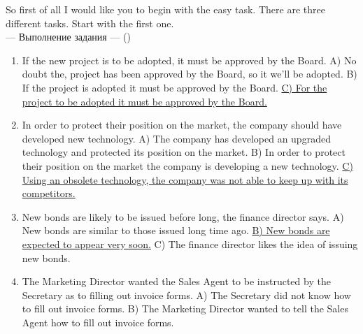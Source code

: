 \documentclass[main.tex]{subfiles}
\begin{document}
So first of all I would like you to begin with the easy task.
There are three different tasks.
Start with the first one.
\\

\hypertarget{ltask:2024-04-03-1}{--- Выполнение задания ---} (\hyperref[task:2024-04-03-1]{\color{blue}{перейти к тексту задания}})
\\

\vspace{5pt}
\begin{enumerate}[nosep, leftmargin=*]
	\itemsep15pt
	\item If the new project is to be adopted, it must be approved by the Board.\newline
		A) No doubt the, project has been approved by the Board, so it we'll be adopted.\newline
		B) If the project is adopted it must be approved by the Board.\newline
		\uline{C) For the project to be adopted it must be approved by the Board.}
	\item In order to protect their position on the market, the company should have developed new technology.\newline
		A) The company has developed an upgraded technology and protected its position on the market.\newline
		B) In order to protect their position on the market the company is developing a new technology.\newline
		\uline{C) Using an obsolete technology, the company was not able to keep up with its competitors.}
	\item New bonds are likely to be issued before long, the finance director says.\newline
		A) New bonds are similar to those issued long time ago.\newline
		\uline{B) New bonds are expected to appear very soon.}\newline
		C) The finance director likes the idea of issuing new bonds.
	\item The Marketing Director wanted the Sales Agent to be instructed by the Secretary as to filling out invoice forms.\newline
		A) The Secretary did not know how to fill out invoice forms.\newline
		B) The Marketing Director wanted to tell the Sales Agent how to fill out invoice forms.\newline

\end{enumerate}
\end{document}
